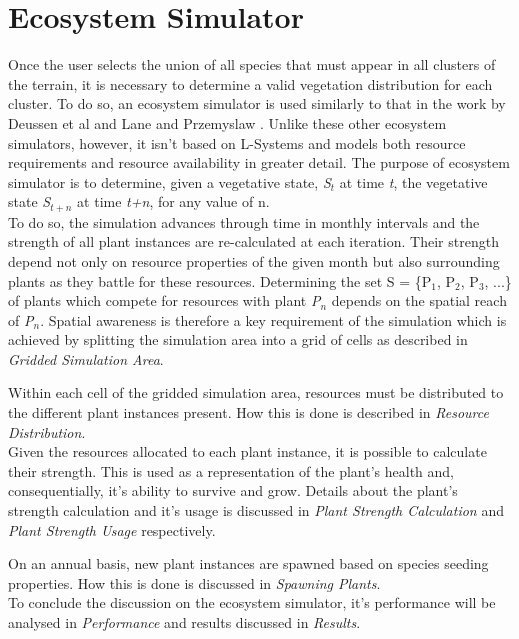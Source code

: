 \section{Ecosystem Simulator}

Once the user selects the union of all species that must appear in all clusters of the terrain, it is necessary to determine a valid vegetation distribution for each cluster. To do so, an ecosystem simulator is used similarly to that in the work by Deussen et al \cite{Deussen1998} and Lane and Przemyslaw \cite{Lane2002}. Unlike these other ecosystem simulators, however, it isn't based on L-Systems and models both resource requirements and resource availability in greater detail. The purpose of ecosystem simulator is to determine, given a vegetative state, \textit{S$_{t}$} at time \textit{t}, the vegetative state \textit{S$_{t+n}$} at time \textit{t+n}, for any value of n.  \\

To do so, the simulation advances through time in monthly intervals and the strength of all plant instances are re-calculated at each iteration. Their strength depend not only on resource properties of the given month but also surrounding plants as they battle for these resources. Determining the set S = \{P$_{1}$, P$_{2}$, P$_{3}$, ...\} of plants which compete for resources with plant \textit{P$_{n}$} depends on the spatial reach of \textit{P$_{n}$}. Spatial awareness is therefore a key requirement of the simulation which is achieved by splitting the simulation area into a grid of cells as described in \textit{Gridded Simulation Area}.

Within each cell of the gridded simulation area, resources must be distributed to the different plant instances present. How this is done is described in \textit{Resource Distribution}. \\

Given the resources allocated to each plant instance, it is possible to calculate their strength. This is used as a representation of the plant's health and, consequentially, it's ability to survive and grow. Details about the plant's strength calculation and it's usage is discussed in \textit{Plant Strength Calculation} and \textit{Plant Strength Usage} respectively.

On an annual basis, new plant instances are spawned based on species seeding properties. How this is done is discussed in \textit{Spawning Plants}.\\

To conclude the discussion on the ecosystem simulator, it's performance will be analysed in \textit{Performance} and results discussed in \textit{Results}.

